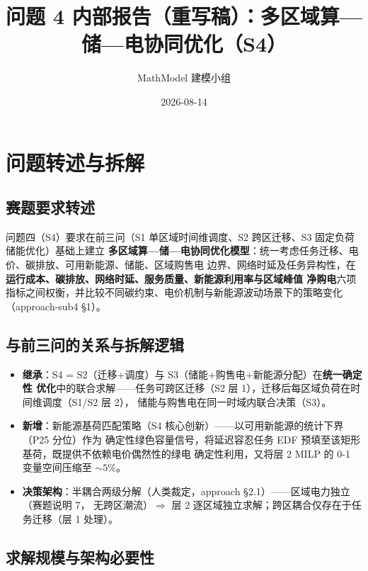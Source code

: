 \documentclass{internal-report}
\title{问题 4 内部报告（重写稿）：多区域算—储—电协同优化（S4）}
\author{MathModel 建模小组}
\date{2026-08-14}
\begin{document}
\maketitle

\section{问题转述与拆解}
\label{sec:intro}

\subsection{赛题要求转述}

问题四（S4）要求在前三问（S1 单区域时间维调度、S2 跨区迁移、S3 固定负荷储能优化）基础上建立
\textbf{多区域算—储—电协同优化模型}：统一考虑任务迁移、电价、碳排放、可用新能源、储能、区域购售电
边界、网络时延及任务异构性，在\textbf{运行成本、碳排放、网络时延、服务质量、新能源利用率与区域峰值
净购电}六项指标之间权衡，并比较不同碳约束、电价机制与新能源波动场景下的策略变化（approach-sub4 §1）。

\subsection{与前三问的关系与拆解逻辑}

\begin{itemize}
  \item \textbf{继承}：S4 = S2（迁移+调度）与 S3（储能+购售电+新能源分配）在\textbf{统一确定性
        优化}中的联合求解——任务可跨区迁移（S2 层 1），迁移后每区域负荷在时间维调度（S1/S2 层 2），
        储能与购售电在同一时域内联合决策（S3）。
  \item \textbf{新增}：新能源基荷匹配策略（S4 核心创新）——以可用新能源的统计下界（P25 分位）作为
        确定性绿色容量信号，将延迟容忍任务 EDF 预填至该矩形基荷，既提供不依赖电价偶然性的绿电
        确定性利用，又将层 2 MILP 的 0-1 变量空间压缩至 $\sim 5\%$。
  \item \textbf{决策架构}：半耦合两级分解（人类裁定，approach §2.1）——区域电力独立（赛题说明 7，
        无跨区潮流）$\Rightarrow$ 层 2 逐区域独立求解；跨区耦合仅存在于任务迁移（层 1 处理）。
\end{itemize}

\subsection{求解规模与架构必要性}
\end{document}
